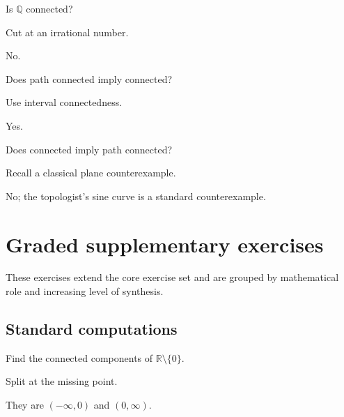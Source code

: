 \begin{exercise}\label{exr:ii07-06}
Is $\mathbb Q$ connected?
\end{exercise}
\begin{hint}
Cut at an irrational number.
\end{hint}
\begin{solution}
No.
\end{solution}

\begin{exercise}\label{exr:ii07-07}
Does path connected imply connected?
\end{exercise}
\begin{hint}
Use interval connectedness.
\end{hint}
\begin{solution}
Yes.
\end{solution}

\begin{exercise}\label{exr:ii07-08}
Does connected imply path connected?
\end{exercise}
\begin{hint}
Recall a classical plane counterexample.
\end{hint}
\begin{solution}
No; the topologist's sine curve is a standard counterexample.
\end{solution}


\section{Graded supplementary exercises}
These exercises extend the core exercise set and are grouped by mathematical role and increasing level of synthesis.

\subsection*{Standard computations}

\begin{exercise}\label{exr:ii07-expand-01}
Find the connected components of \(\mathbb R\setminus\{0\}\).
\end{exercise}
\begin{hint}
Split at the missing point.
\end{hint}
\begin{solution}
They are \((-\infty,0)\) and \((0,\infty)\).
\end{solution}

